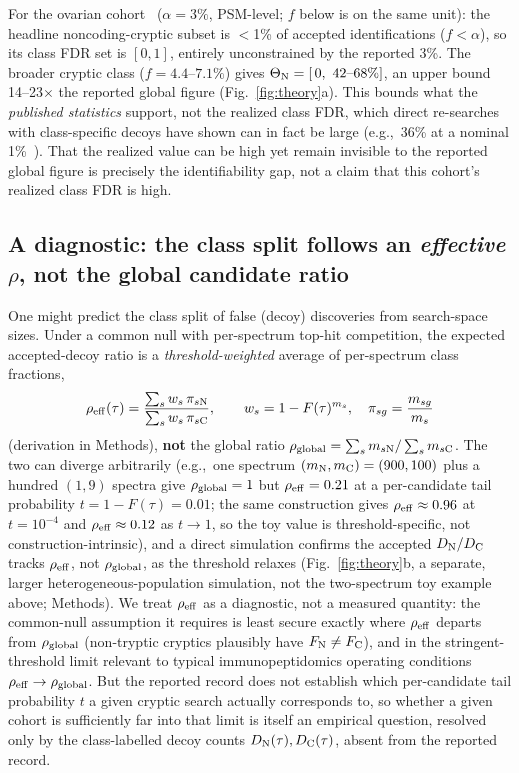 For the ovarian cohort~\cite{r1} ($\alpha = 3\%$, PSM-level; $f$ below is on the same unit): the headline noncoding-cryptic subset is $<$1\% of accepted identifications ($f < \alpha$), so its class FDR set is $[0,1]$, entirely unconstrained by the reported 3\%. The broader cryptic class ($f = 4.4\text{--}7.1\%$) gives $\Theta_{\mathrm{N}}=[\,0,\ 42\text{--}68\%]$, an upper bound 14--23$\times$ the reported global figure (Fig.~\ref{fig:theory}a). This bounds what the \emph{published statistics} support, not the realized class FDR, which direct re-searches with class-specific decoys have shown can in fact be large (e.g.,\ 36\% at a nominal 1\%~\cite{r19,r20}). That the realized value can be high yet remain invisible to the reported global figure is precisely the identifiability gap, not a claim that this cohort's realized class FDR is high.

\subsection{A diagnostic: the class split follows an \emph{effective} \texorpdfstring{$\rho$}{rho}, not the global candidate ratio}
One might predict the class split of false (decoy) discoveries from search-space sizes. Under a common null with per-spectrum top-hit competition, the expected accepted-decoy ratio is a \emph{threshold-weighted} average of per-spectrum class fractions,
\begin{equation}
\rho_{\mathrm{eff}}(\tau) = \frac{\sum_s w_s\,\pi_{s\mathrm{N}}}{\sum_s w_s\,\pi_{s\mathrm{C}}},
\qquad w_s = 1-F(\tau)^{m_s},\quad \pi_{sg}=\frac{m_{sg}}{m_s}
\label{eq:rhoeff}
\end{equation}
(derivation in Methods), \textbf{not} the global ratio $\rho_{\mathrm{global}}=\sum_s m_{s\mathrm{N}} / \sum_s m_{s\mathrm{C}}$. The two can diverge arbitrarily (e.g.,\ one spectrum $(m_{\mathrm{N}},m_{\mathrm{C}})=(900,100)$ plus a hundred $(1,9)$ spectra give $\rho_{\mathrm{global}} = 1$ but $\rho_{\mathrm{eff}} = 0.21$ at a per-candidate tail probability $t=1-F(\tau)=0.01$; the same construction gives $\rho_{\mathrm{eff}}\approx0.96$ at $t=10^{-4}$ and $\rho_{\mathrm{eff}}\approx0.12$ as $t\to1$, so the toy value is threshold-specific, not construction-intrinsic), and a direct simulation confirms the accepted $D_{\mathrm{N}}/D_{\mathrm{C}}$ tracks $\rho_{\mathrm{eff}}$, not $\rho_{\mathrm{global}}$, as the threshold relaxes (Fig.~\ref{fig:theory}b, a separate, larger heterogeneous-population simulation, not the two-spectrum toy example above; Methods). We treat $\rho_{\mathrm{eff}}$ as a diagnostic, not a measured quantity: the common-null assumption it requires is least secure exactly where $\rho_{\mathrm{eff}}$ departs from $\rho_{\mathrm{global}}$ (non-tryptic cryptics plausibly have $F_{\mathrm{N}}\ne F_{\mathrm{C}}$), and in the stringent-threshold limit relevant to typical immunopeptidomics operating conditions $\rho_{\mathrm{eff}}\to\rho_{\mathrm{global}}$. But the reported record does not establish which per-candidate tail probability $t$ a given cryptic search actually corresponds to, so whether a given cohort is sufficiently far into that limit is itself an empirical question, resolved only by the class-labelled decoy counts $D_{\mathrm{N}}(\tau),D_{\mathrm{C}}(\tau)$, absent from the reported record.

